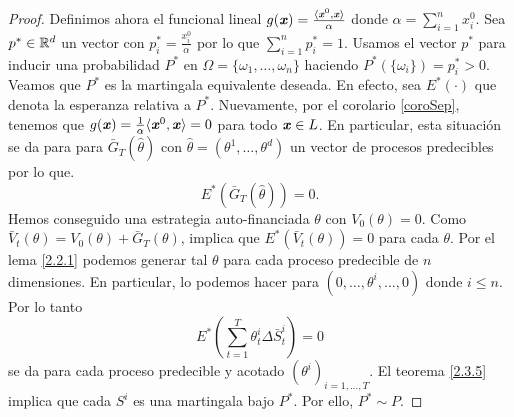 \begin{proof}
	Definimos ahora el funcional lineal $ g(\textbf{\emph{x}}) = \frac{\langle \textbf{\emph{x}}^0, \textbf{\emph{x}}\rangle}{\alpha} $ donde $ \alpha = \sum_{i=1}^{n} x^0_i$. Sea $ p^* \in \mathbb{R}^d$ un vector con $ p^*_i = \frac{x_i^0}{\alpha} $ por lo que $ \sum_{i=1}^{n} p^*_i = 1 $. Usamos el vector $ p^* $ para inducir una probabilidad $ P^* $ en $ \Omega = \{\omega_1,\dots,\omega_n\} $ haciendo $ P^*(\{\omega_i\}) = p^*_{i} > 0 $. Veamos que $ P^* $ es la martingala equivalente deseada. En efecto, sea $ E^*(\cdot) $ que denota la esperanza relativa a $ P^* $. Nuevamente, por el corolario \ref{coroSep}, tenemos que $ g(\textbf{\emph{x}}) = \frac{1}{\alpha}\langle \textbf{\emph{x}}^0,\textbf{\emph{x}}\rangle = 0$ para todo $ \textbf{\emph{x}}\in L $. En particular, esta situación se da para  para $ \bar{G}_T (\hat{\theta}) $ con $ \hat{\theta}=(\theta^1,\dots,\theta^d) $ un vector de procesos predecibles por lo que.
	\[ E^*(\bar{G}_T (\hat{\theta})) = 0.\]
	Hemos conseguido una estrategia auto-financiada $ \theta $ con $ V_0(\theta) = 0 $. Como $ \bar{V}_t (\theta) = V_0(\theta) + \bar{G}_T (\theta)$, implica que $ E^*(\bar{V}_t (\theta)) = 0 $ para cada $ \theta $. Por el lema \ref{2.2.1} podemos generar tal $ \theta $ para cada proceso predecible de $ n $  dimensiones. En particular, lo podemos hacer para $ (0,\dots, \theta^i,\dots,0) $ donde $ i\leq n $. Por lo tanto
	\[
	E^*(\sum_{t=1}^{T}\theta_t^i\Delta \bar{S}^i_t) = 0
	\]
	se da para cada proceso predecible y acotado $ (\theta^i)_{i=1,\dots,T} $. El teorema \ref{2.3.5} implica que cada $ S^i $ es una martingala bajo $ P^* $. Por ello, $ P^* \sim P $.
\end{proof}
\bigskip